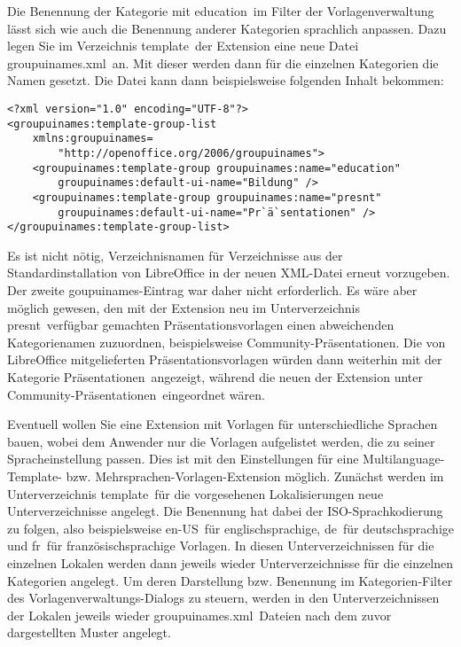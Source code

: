 \documentclass[a4paper,10pt,pagesize,titlepage]{scrbook}
\begin{document}
Die Benennung der Kategorie mit \glqq education\grqq~im Filter der Vorlagenverwaltung lässt sich wie auch die Benennung anderer Kategorien sprachlich anpassen. Dazu legen Sie im Verzeichnis \glqq template\grqq~der Extension eine neue Datei \glqq groupuinames.xml\grqq~an. Mit dieser werden dann für die einzelnen Kategorien die Namen gesetzt. Die Datei kann dann beispielsweise folgenden Inhalt bekommen:

\begin{lstlisting}[language={[LaTeX]TeX},inputencoding={utf8},extendedchars=false, escapeinside=``]
<?xml version="1.0" encoding="UTF-8"?>
<groupuinames:template-group-list
    xmlns:groupuinames=
        "http://openoffice.org/2006/groupuinames">
    <groupuinames:template-group groupuinames:name="education"
        groupuinames:default-ui-name="Bildung" />
    <groupuinames:template-group groupuinames:name="presnt"
        groupuinames:default-ui-name="Pr`ä`sentationen" />
</groupuinames:template-group-list>

\end{lstlisting}

Es ist nicht nötig, Verzeichnisnamen für Verzeichnisse aus der Standardinstallation von LibreOffice in der neuen XML-Datei erneut vorzugeben. Der zweite goupuinames-Eintrag war daher nicht erforderlich. Es wäre aber möglich gewesen, den mit der Extension neu im Unterverzeichnis \glqq presnt\grqq~verfügbar gemachten Präsentationsvorlagen einen abweichenden Kategorienamen zuzuordnen, beispielsweise \glqq Community-Präsentationen\grqq. Die von LibreOffice mitgelieferten Präsentationsvorlagen würden dann weiterhin mit der Kategorie \glqq Präsentationen\grqq~angezeigt, während die neuen der Extension unter \glqq Community-Präsentationen\grqq~eingeordnet wären.

Eventuell wollen Sie eine Extension mit Vorlagen für unterschiedliche Sprachen bauen, wobei dem Anwender nur die Vorlagen aufgelistet werden, die zu seiner Spracheinstellung passen. Dies ist mit den Einstellungen für eine Multilanguage-Template- bzw. Mehrsprachen-Vorlagen-Extension möglich. Zunächst werden im Unterverzeichnis \glqq template\grqq~für die vorgesehenen Lokalisierungen neue Unterverzeichnisse angelegt. Die Benennung hat dabei der ISO-Sprachkodierung zu folgen, also  beispielsweise \glqq en-US\grqq~für englischsprachige, \glqq de\grqq~für deutschsprachige und \glqq fr\grqq~für französischsprachige Vorlagen. In diesen Unterverzeichnissen für die einzelnen Lokalen werden dann jeweils wieder Unterverzeichnisse für die einzelnen Kategorien angelegt. Um deren Darstellung bzw. Benennung im Kategorien-Filter des Vorlagenverwaltungs-Dialogs zu steuern, werden in den Unterverzeichnissen der Lokalen jeweils wieder \glqq groupuinames.xml\grqq~Dateien nach dem zuvor dargestellten Muster angelegt.
\end{document}
